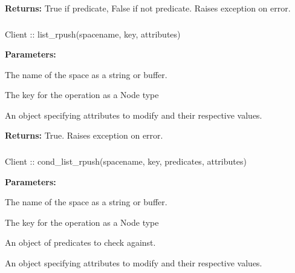 \noindent\textbf{Returns:}
True if predicate, False if not predicate.  Raises exception on error.

\subsubsection{}
\label{api:nodejs:list_rpush}
\begin{javascriptcode}
Client :: list_rpush(spacename, key, attributes)
\end{javascriptcode}


\noindent\textbf{Parameters:}
\begin{description}[labelindent=\widthof{{\code{attributes}}},leftmargin=*,noitemsep,nolistsep,align=right]
\item[\code{spacename}] The name of the space as a string or buffer.
\item[\code{key}] The key for the operation as a Node type
\item[\code{attributes}] An object specifying attributes to modify and their respective values.
\end{description}

\noindent\textbf{Returns:}
True.  Raises exception on error.

\subsubsection{}
\label{api:nodejs:cond_list_rpush}
\begin{javascriptcode}
Client :: cond_list_rpush(spacename, key, predicates, attributes)
\end{javascriptcode}


\noindent\textbf{Parameters:}
\begin{description}[labelindent=\widthof{{\code{predicates}}},leftmargin=*,noitemsep,nolistsep,align=right]
\item[\code{spacename}] The name of the space as a string or buffer.
\item[\code{key}] The key for the operation as a Node type
\item[\code{predicates}] An object of predicates to check against.
\item[\code{attributes}] An object specifying attributes to modify and their respective values.
\end{description}

